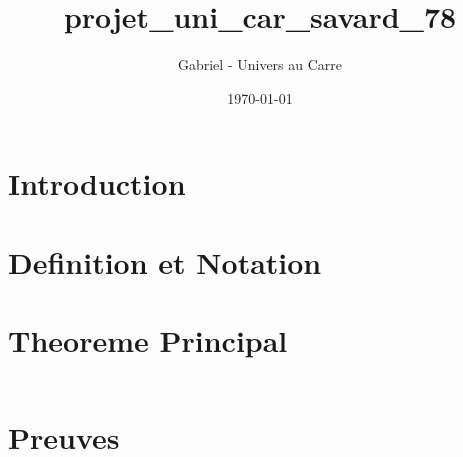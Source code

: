 \documentclass[12pt]{article}
\title{projet_uni_car_savard_78}
\author{Gabriel - Univers au Carre}
\date{\today}
\begin{document}
\maketitle


\section{Introduction}



\section{Definition et Notation}



\section{Theoreme Principal}


\begin{equation}
\end{equation}


\section{Preuves}


\end{document}
